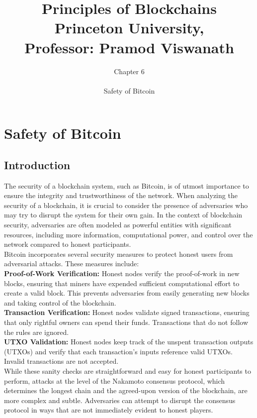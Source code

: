 \documentclass{report}
\title{\Huge{Principles of Blockchains \\ Princeton University,\\
		Professor: Pramod Viswanath}}
\author{\huge{Chapter 6} \\\\ Safety of Bitcoin}
\begin{document}
\maketitle
\newpage%
\tableofcontents
\pagebreak

\chapter{Safety of Bitcoin}

\section{Introduction}

The security of a blockchain system, such as Bitcoin, is of utmost importance to ensure the integrity and trustworthiness of the network. When analyzing the security of a blockchain, it is crucial to consider the presence of adversaries who may try to disrupt the system for their own gain. In the context of blockchain security, adversaries are often modeled as powerful entities with significant resources, including more information, computational power, and control over the network compared to honest participants.\\
Bitcoin incorporates several security measures to protect honest users from adversarial attacks. These measures include:\\
\textbf{Proof-of-Work Verification:} Honest nodes verify the proof-of-work in new blocks, ensuring that miners have expended sufficient computational effort to create a valid block. This prevents adversaries from easily generating new blocks and taking control of the blockchain.\\
\textbf{Transaction Verification:} Honest nodes validate signed transactions, ensuring that only rightful owners can spend their funds. Transactions that do not follow the rules are ignored.\\
\textbf{UTXO Validation:} Honest nodes keep track of the unspent transaction outputs (UTXOs) and verify that each transaction's inputs reference valid UTXOs. Invalid transactions are not accepted.\\
While these sanity checks are straightforward and easy for honest participants to perform, attacks at the level of the Nakamoto consensus protocol, which determines the longest chain and the agreed-upon version of the blockchain, are more complex and subtle. Adversaries can attempt to disrupt the consensus protocol in ways that are not immediately evident to honest players.\\
\end{document}
